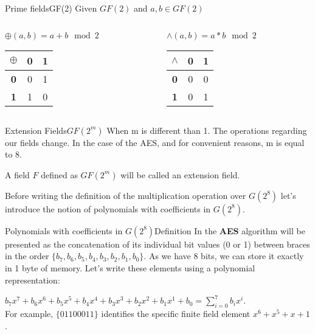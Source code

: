 \begin{frame}[t]{Prime fields}{GF(2)}
	Given $GF(2)$ and $a, b \in GF(2)$ 
	\bigskip
	\medskip	
	\begin{columns}
		\begin{column}{0.5\textwidth}
			\centering $\oplus(a, b) = a + b \mod 2$		
			\begin{table}[]
				\begin{tabular}{c|cc}
					\textbf{$\oplus$} & \textbf{0} & \textbf{1} \\ \hline
					\textbf{0} & 0         & 1           \\
					\textbf{1} &1          & 0           \\
					      
				\end{tabular}
			\end{table}
		\end{column}
		\begin{column}{0.5\textwidth}  %
			\centering $\wedge(a, b) = a * b \mod 2$	
			\begin{table}[]
				\begin{tabular}{c|cc}
					\textbf{$\wedge$} & \textbf{0} & \textbf{1} \\ \hline
					\textbf{0} & 0          & 0                 \\
					\textbf{1} & 0          & 1                 \\
					        
				\end{tabular}
			\end{table}
		\end{column}
	\end{columns}
\end{frame}

\begin{frame}[t]{Extension Fields}{$GF(2^m)$}
	When m is different than 1. The operations regarding our fields change. In the case of the AES, and for convenient reasons, m is equal to 8.
	
	A field $F$ defined as $GF(2^m)$ will be called an extension field.
	
	Before writing the definition of the multiplication operation over $G(2^8)$ let's introduce the notion of polynomials with coefficients in $G(2^8)$.
	
\end{frame}

\begin{frame}[t]{Polynomials with coefficients in $G(2^8)$}{Definition}
	In the \textbf{AES} algorithm will be presented as the concatenation of its individual bit values (0 or 1) between braces in the order $\{ b_7, b_6, b_5, b_4, b_3, b_2, b_1, b_0 \}$. As we have 8 bits, we can store it exactly in 1 byte of memory. Let's write these elements using a polynomial representation: \bigskip
	

	$b_7x^7 + b_6x^6 + b_5x^5 + b_4x^4 + b_3x^3 + b_2x^2 + b_1x^1 + b_0 = \sum_{i=0}^{7}b_ix^i$. \\[10pt]


	For example, $\{01100011\}$ identifies the specific finite field element $x^6 + x^5 + x + 1$.
		
\end{frame}

